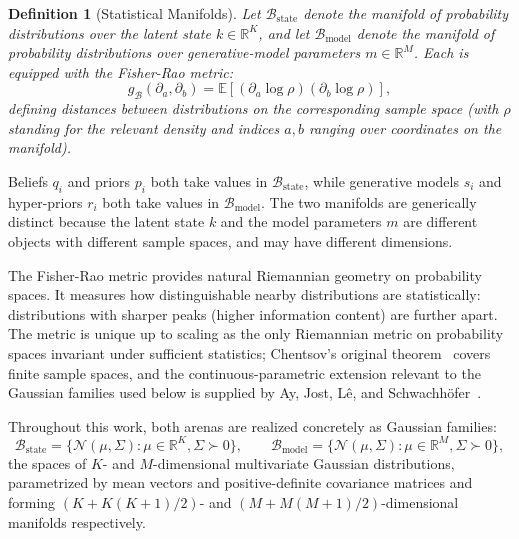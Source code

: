 \documentclass[11pt]{article}
\newtheorem{definition}{Definition}
\begin{document}
\begin{definition}[Statistical Manifolds]
Let $\mathcal{B}_{\mathrm{state}}$ denote the manifold of probability distributions over the latent state $k \in \mathbb{R}^K$, and let $\mathcal{B}_{\mathrm{model}}$ denote the manifold of probability distributions over generative-model parameters $m \in \mathbb{R}^M$. Each is equipped with the Fisher-Rao metric:
\begin{equation}
g_{\mathcal{B}}(\partial_a, \partial_b) = \mathbb{E}\left[(\partial_a \log \rho)(\partial_b \log \rho)\right],
\end{equation}
defining distances between distributions on the corresponding sample space (with $\rho$ standing for the relevant density and indices $a, b$ ranging over coordinates on the manifold).
\end{definition}

Beliefs $q_i$ and priors $p_i$ both take values in $\mathcal{B}_{\mathrm{state}}$, while generative models $s_i$ and hyper-priors $r_i$ both take values in $\mathcal{B}_{\mathrm{model}}$. The two manifolds are generically distinct because the latent state $k$ and the model parameters $m$ are different objects with different sample spaces, and may have different dimensions.

The Fisher-Rao metric provides natural Riemannian geometry on probability spaces. It measures how distinguishable nearby distributions are statistically: distributions with sharper peaks (higher information content) are further apart. The metric is unique up to scaling as the only Riemannian metric on probability spaces invariant under sufficient statistics; Chentsov's original theorem~\cite{Cencov1982} covers finite sample spaces, and the continuous-parametric extension relevant to the Gaussian families used below is supplied by Ay, Jost, L\^{e}, and Schwachh\"{o}fer~\cite{AyJostLeSchwachhofer2017}.

Throughout this work, both arenas are realized concretely as Gaussian families:
\begin{equation}
\mathcal{B}_{\mathrm{state}} = \{\mathcal{N}(\mu, \Sigma) : \mu \in \mathbb{R}^K, \Sigma \succ 0\},
\qquad
\mathcal{B}_{\mathrm{model}} = \{\mathcal{N}(\mu, \Sigma) : \mu \in \mathbb{R}^M, \Sigma \succ 0\},
\end{equation}
the spaces of $K$- and $M$-dimensional multivariate Gaussian distributions, parametrized by mean vectors and positive-definite covariance matrices and forming $(K + K(K+1)/2)$- and $(M + M(M+1)/2)$-dimensional manifolds respectively.
\end{document}
